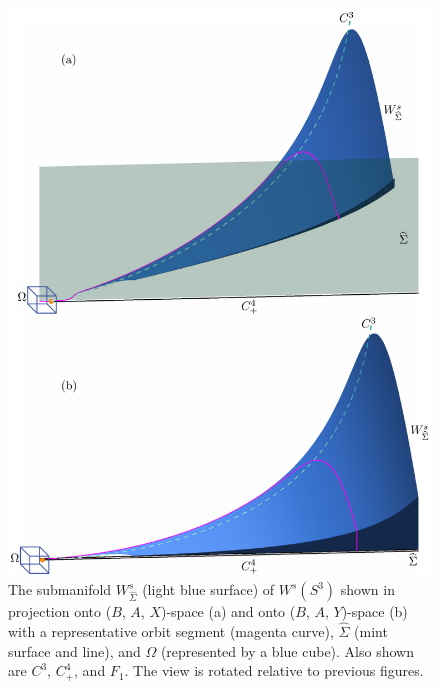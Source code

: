 \documentclass{ws-ijbc}
\begin{document}
\begin{figure}[H]
\centering
\includegraphics[]{./figures/MKMO_4.pdf}
\caption{The submanifold $W^{s}_{\widehat{\Sigma}}$ (light blue surface) of $W^s(S^3)$ shown in projection onto ($B$, $A$, $X$)-space (a) and onto ($B$, $A$, $Y$)-space (b) with a representative orbit segment (magenta curve), $\widehat{\Sigma}$ (mint surface and line), and $\Omega$ (represented by a blue cube).  Also shown are $C^3$, $C^4_+$, and $F_1$.  The view is rotated relative to previous figures.}
\label{piece}
\end{figure}
\end{document}
